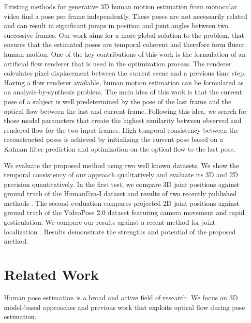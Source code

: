 \documentclass[10pt,twocolumn,letterpaper]{article}
\begin{document}
Existing methods for generative 3D human motion estimation from monocular video find a pose per frame independently. These poses are not necessarily related and can result in significant jumps in position and joint angles between two successive frames. Our work aims for a more global solution to the problem, that ensures that the estimated poses are temporal coherent and therefore form fluent human motion. One of the key contributions of this work is the formulation of an artificial flow renderer that is used in the optimization process. The renderer calculates pixel displacement between the current scene and a previous time step. Having a flow renderer available, human motion estimation can be formulated as an analysis-by-synthesis problem.
The main idea of this work is that the current pose of a subject is well predetermined by the pose of the last frame and the optical flow between the last and current frame. Following this idea, we search for those model parameters that create the highest similarity between observed and rendered flow for the two input frames. %
High temporal consistency between the reconstructed poses is achieved by initializing the current pose based on a Kalman filter prediction and optimization on the optical flow to the last pose.

We evaluate the proposed method using two well known datasets. We show the temporal consistency of our approach qualitatively and evaluate its 3D and 2D precision quantitatively. In the first test, we compare 3D joint positions against ground truth of the HumanEva-I dataset \cite{sigal2010humaneva} and results of two recently published methods \cite{bogo2016smplify,wandt20163d}. The second evaluation compares projected 2D joint positions against ground truth of the VideoPose 2.0 dataset \cite{sapp2011parsing} featuring camera movement and rapid gesticulation. We compare our results against  a recent method for joint localization \cite{deepcut16cvpr}. Results demonstrate the strengths and potential of the proposed method.



\section{Related Work}
Human pose estimation is a broad and active field of research. We focus on 3D model-based approaches and previous work that exploits optical flow during pose estimation.
\end{document}
